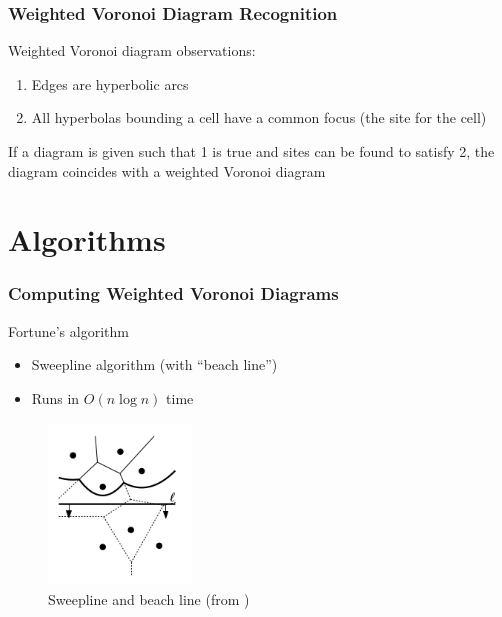\documentclass{beamer}
\begin{document}
\begin{frame}
  \frametitle{Weighted Voronoi Diagram Recognition}

  Weighted Voronoi diagram observations:
  \begin{enumerate}
    \item Edges are hyperbolic arcs
    \item All hyperbolas bounding a cell have a common focus (the site for the cell)
  \end{enumerate}

  If a diagram is given such that 1 is true and sites can be found to satisfy 2, the diagram coincides with a weighted Voronoi diagram
  \cite{ash-bolker}

\end{frame}

\section{Algorithms}

\begin{frame}
  \frametitle{Computing Weighted Voronoi Diagrams}

  Fortune's algorithm \cite{fortune_sweepline} \cite{rosenberger_additive}
  \begin{itemize}
    \item Sweepline algorithm (with ``beach line'')
    \item Runs in $O(n \log n)$ time
  \end{itemize}

  \begin{figure}
    \includegraphics[width=1.5in]{beach(comp_geom).png}
    \caption{Sweepline and beach line (from \cite{comp_geom})}
  \end{figure}

\end{frame}
\end{document}

